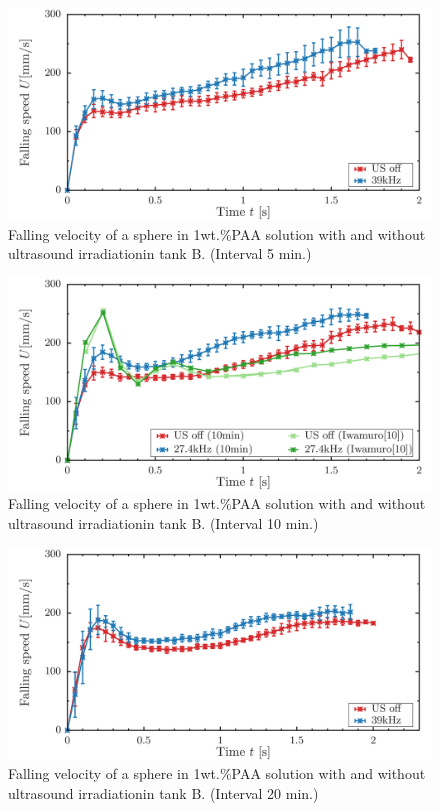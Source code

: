 \begin{figure}[ht]
    \centering
    \includegraphics[width=14cm,clip]{./4-Results/s1-5.png}
    \caption{Falling velocity of a sphere in 1wt.\%PAA solution with and without ultrasound irradiationin tank B. (Interval 5 min.)}
    \label{fig:falling-5}
\end{figure}
\begin{figure}[ht]
    \centering
    \includegraphics[width=14cm,clip]{./4-Results/s1-10.png}
    \caption{Falling velocity of a sphere in 1wt.\%PAA solution with and without ultrasound irradiationin tank B. (Interval 10 min.)}
    \label{fig:falling-10}
\end{figure}
\begin{figure}[ht]
    \centering
    \includegraphics[width=14cm,clip]{./4-Results/s1-20.png}
    \caption{Falling velocity of a sphere in 1wt.\%PAA solution with and without ultrasound irradiationin tank B. (Interval 20 min.)}
    \label{fig:falling-20}
\end{figure}


